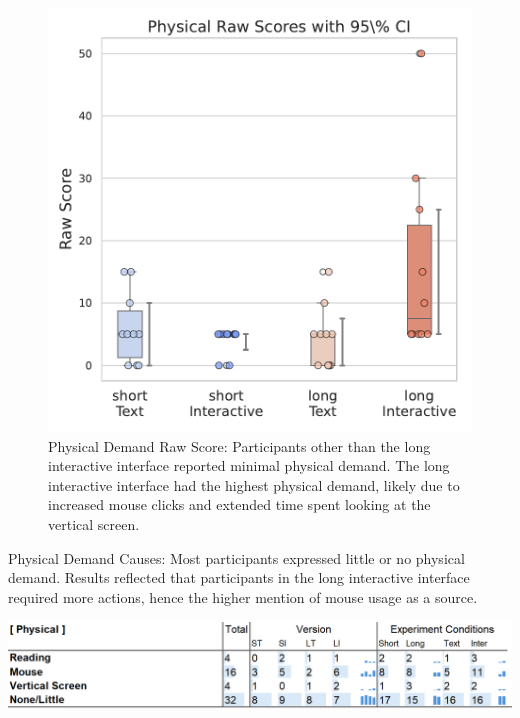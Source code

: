 \begin{figure}[h]
\begin{minipage}[t]{0.45\textwidth}
        \includegraphics[width=\textwidth, trim=0 13 0 13, clip]{content/image/cog/Physical_scores.pdf}
        \captionsetup{width=0.9\textwidth, justification=justified}
        \caption{Physical Demand Raw Score: Participants other than the long interactive interface reported minimal physical demand. The long interactive interface had the highest physical demand, likely due to increased mouse clicks and extended time spent looking at the vertical screen.}
        \label{fig:physical_cog_score}
    \end{minipage}
\end{figure}

\begin{table}[h]
    \caption{Physical Demand Causes: Most participants expressed little or no physical demand. Results reflected that participants in the long interactive interface required more actions, hence the higher mention of mouse usage as a source.}
    \label{tbl:physical}
    \includegraphics[width=\linewidth]{content/image/cog/physical_table.png}
\end{table}

